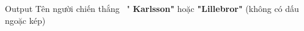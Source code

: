 Output
Tên người chiến thắng  "   \textbf{    Karlsson"   }   hoặc   \textbf{    "Lillebror"   }   (không có dấu ngoặc kép)